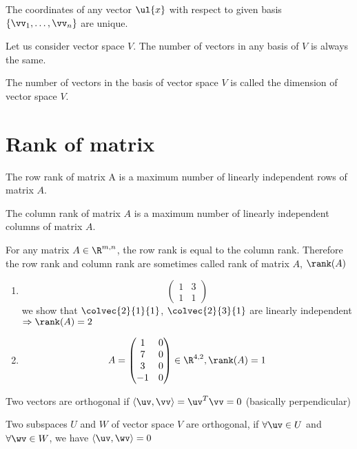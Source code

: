 \begin{remark}
The coordinates of any vector $\ul{x}$ with respect to given basis $\{\vv_1,\dots,\vv_n\}$ are unique.
\end{remark}

\begin{theorem}
Let us consider vector space $V$. The number of vectors in any basis of $V$ is always the same.
\end{theorem}
\begin{remark}
The number of vectors in the basis of vector space $V$ is called the dimension of vector space $V$.	
\end{remark}

\section{Rank of matrix}
\begin{definition}
The row rank of matrix A is a maximum number of linearly independent rows of matrix $A$.
\end{definition}
\begin{definition}
The column rank of matrix $A$ is a maximum number of linearly independent columns of matrix $A$.
\end{definition}

\begin{remark}
For any matrix $A\in\R^{m,n}	$, the row rank is equal to the column rank. Therefore the row rank and column rank are sometimes called rank of matrix $A$, $\rank(A)$
\end{remark}

\begin{example}
\begin{enumerate}
\item \[\begin{pmatrix}
1 & 3\\
1 & 1	
\end{pmatrix}
\]
we show that $\colvec{2}{1}{1}$, $\colvec{2}{3}{1}$ are linearly independent $\Rightarrow\rank(A)=2$
\item \[
A = \begin{pmatrix}
1 & 0\\
7 & 0\\
3 & 0\\
-1 & 0
\end{pmatrix} \in\R^{4,2}, \rank(A)=1
\]
\end{enumerate}
\end{example}

\begin{remark}
Two vectors are orthogonal if $\langle\uv,\vv\rangle = \uv^T\vv = 0$	 (basically perpendicular)
\end{remark}
\begin{definition}
Two subspaces $U$ and $W$ of vector space $V$ are orthogonal, if $\forall \uv\in U$ and $\forall \wv\in W$, we have $\langle \uv,\wv\rangle = 0$
\end{definition}

